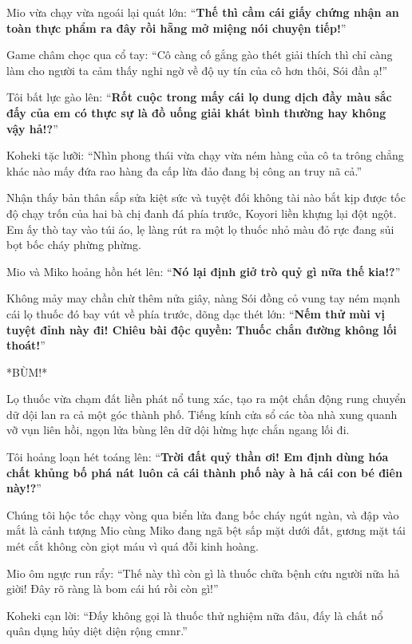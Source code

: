 \documentclass[../main.tex]{subfiles}
\begin{document}
Mio vừa chạy vừa ngoái lại quát lớn: ``\textbf{Thế thì cầm cái giấy chứng nhận an toàn thực phẩm ra đây rồi hẵng mở miệng nói chuyện tiếp!}''

Game châm chọc qua cổ tay: ``Cô càng cố gắng gào thét giải thích thì chỉ càng làm cho người ta cảm thấy nghi ngờ về độ uy tín của cô hơn thôi, Sói đần ạ!''

Tôi bất lực gào lên: ``\textbf{Rốt cuộc trong mấy cái lọ dung dịch đầy màu sắc đấy của em có thực sự là đồ uống giải khát bình thường hay không vậy hả!?}''

Koheki tặc lưỡi: ``Nhìn phong thái vừa chạy vừa ném hàng của cô ta trông chẳng khác nào mấy đứa rao hàng đa cấp lừa đảo đang bị công an truy nã cả.''

Nhận thấy bản thân sắp sửa kiệt sức và tuyệt đối không tài nào bắt kịp được tốc độ chạy trốn của hai bà chị đanh đá phía trước, Koyori liền khựng lại đột ngột. Em ấy thò tay vào túi áo, lẹ làng rút ra một lọ thuốc nhỏ màu đỏ rực đang sủi bọt bốc cháy phừng phừng.

Mio và Miko hoảng hồn hét lên: ``\textbf{Nó lại định giở trò quỷ gì nữa thế kia!?}''

Không mảy may chần chừ thêm nửa giây, nàng Sói đồng cỏ vung tay ném mạnh cái lọ thuốc đó bay vút về phía trước, dõng dạc thét lớn: ``\textbf{Nếm thử mùi vị tuyệt đỉnh này đi! Chiêu bài độc quyền: Thuốc chắn đường không lối thoát!}''

*BÙM!*

Lọ thuốc vừa chạm đất liền phát nổ tung xác, tạo ra một chấn động rung chuyển dữ dội lan ra cả một góc thành phố. Tiếng kính cửa sổ các tòa nhà xung quanh vỡ vụn liên hồi, ngọn lửa bùng lên dữ dội hừng hực chắn ngang lối đi.


Tôi hoảng loạn hét toáng lên: ``\textbf{Trời đất quỷ thần ơi! Em định dùng hóa chất khủng bố phá nát luôn cả cái thành phố này à hả cái con bé điên này!?}''

Chúng tôi hộc tốc chạy vòng qua biển lửa đang bốc cháy ngút ngàn, và đập vào mắt là cảnh tượng Mio cùng Miko đang ngã bệt sấp mặt dưới đất, gương mặt tái mét cắt không còn giọt máu vì quá đỗi kinh hoàng.


Mio ôm ngực run rẩy: ``Thế này thì còn gì là thuốc chữa bệnh cứu người nữa hả giời! Đây rõ ràng là bom cái hú rồi còn gì!''

Koheki cạn lời: ``Đấy không gọi là thuốc thử nghiệm nữa đâu, đấy là chất nổ quân dụng hủy diệt diện rộng cmnr.''
\end{document}

